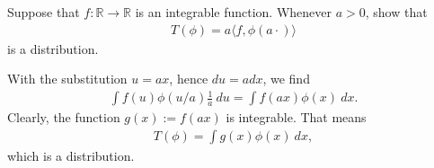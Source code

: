\documentclass[11pt]{article}
\begin{document}
\begin{exercise}
    Suppose that $f : \mathbb R \rightarrow \mathbb R$ is an integrable function. 
    Whenever $a > 0$, show that 
    \begin{align}
        T( \phi ) = a \langle f, \phi(a \cdot) \rangle 
    \end{align}
    is a distribution. 
\end{exercise}
\begin{solution}
    With the substitution $u = ax$, hence $du = a dx$, we find 
    \begin{align}
        \int f(u) \phi(u/a) \frac 1 a \ d u
        = 
        \int f(ax) \phi(x) \ d x 
        .
    \end{align}
    Clearly, the function $g(x) := f(ax)$ is integrable. That means 
    \begin{align}
        T( \phi ) = \int g(x) \phi(x) \ dx,
    \end{align}
    which is a distribution. 
\end{solution}
\end{document}
